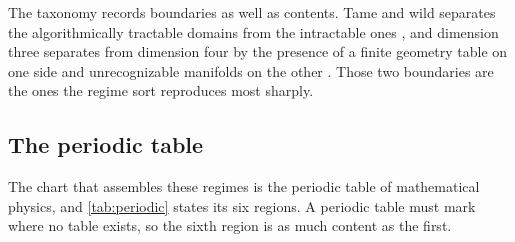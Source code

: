 \documentclass[11pt,letterpaper]{article}
\theoremstyle{definition}
\theoremstyle{remark}
\begin{document}
The taxonomy records boundaries as well as contents. Tame and wild separates the algorithmically tractable domains from the intractable ones \cite{corpus-57}, and dimension three separates from dimension four by the presence of a finite geometry table on one side and unrecognizable manifolds on the other \cite{corpus-54,corpus-60}. Those two boundaries are the ones the regime sort reproduces most sharply.

\subsection{The periodic table}

The chart that assembles these regimes is the periodic table of mathematical physics, and \cref{tab:periodic} states its six regions. A periodic table must mark where no table exists, so the sixth region is as much content as the first.
\end{document}
